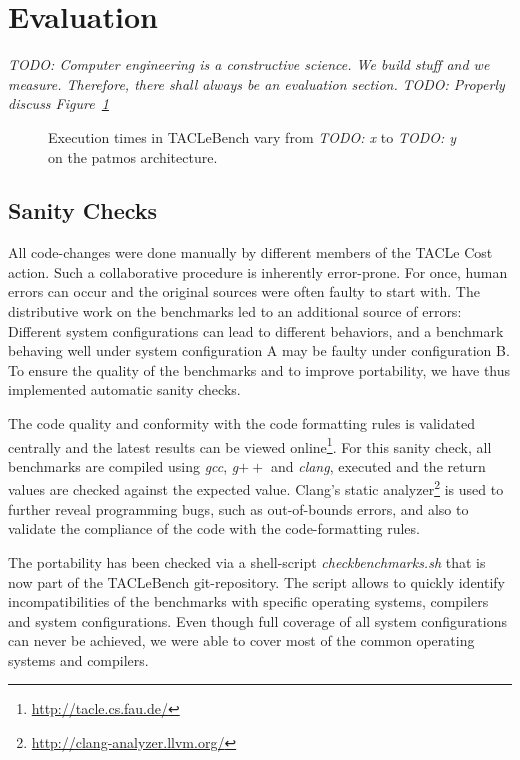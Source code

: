 \documentclass[a4paper,UKenglish]{oasics}
\newcommand{\todo}[1]{{\emph{TODO: #1}}}
\begin{document}
\section{Evaluation}
\label{sec:eval}

\todo{Computer engineering is a constructive science. We build stuff and we measure.
Therefore, there shall always be an evaluation section.}
\todo{Properly discuss Figure~\ref{fig:execution-times}}
\begin{figure}[t]
  \def\resultfile{eval/wcet.csv}
  
  \caption{Execution times in TACLeBench vary from \todo{x} to \todo{y} on the patmos architecture.}
  \label{fig:execution-times}
\end{figure}

\subsection{Sanity Checks}
All code-changes were done manually by different members of the TACLe Cost action.
Such a collaborative procedure is inherently error-prone. 
For once, human errors can occur and the original sources were often faulty to start with.
The distributive work on the benchmarks led to an additional source of errors: 
Different system configurations can lead to different behaviors, and a benchmark behaving well under system configuration A may be faulty under configuration B.
To ensure the quality of the benchmarks and to improve portability, we have thus implemented automatic sanity checks. 

The code quality and conformity with the code formatting rules is validated centrally and the latest results can be viewed online\footnote{\url{http://tacle.cs.fau.de/}}. 
For this sanity check, all benchmarks are compiled using \textit{gcc}, \textit{g$++$} and \textit{clang}, executed and the return values are checked against the expected value. 
Clang's static analyzer\footnote{\url{http://clang-analyzer.llvm.org/}} is used to further reveal programming bugs, such as out-of-bounds errors, and also to validate the compliance of the code with the code-formatting rules.

The portability has been checked via a shell-script \textit{checkbenchmarks.sh} that is now part of the TACLeBench git-repository.
The script allows to quickly identify incompatibilities of the benchmarks with specific operating systems, compilers and system configurations.
Even though full coverage of all system configurations can never be achieved, we were able to cover most of the common operating systems and compilers.
\end{document}
